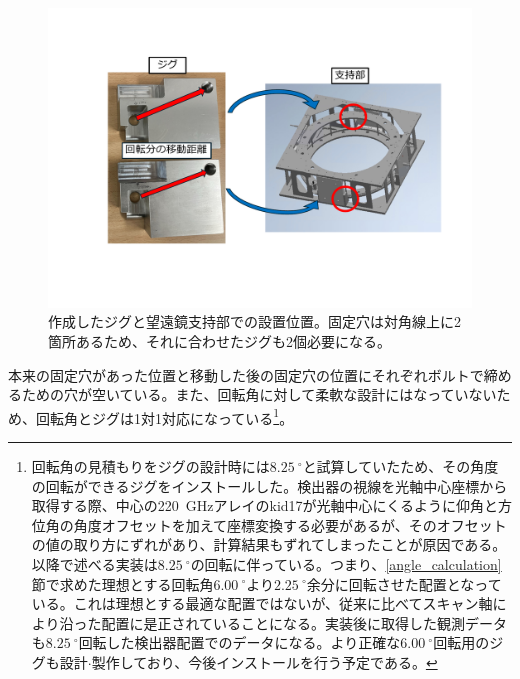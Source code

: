 \begin{figure}[htbp]
  \centering
  \includegraphics[width=0.85\columnwidth]{5_alignment/figs/jig_making.pdf}
  \caption{作成したジグと望遠鏡支持部での設置位置。固定穴は対角線上に2箇所あるため、それに合わせたジグも2個必要になる。}
  \label{jig_fixing}
\end{figure}
本来の固定穴があった位置と移動した後の固定穴の位置にそれぞれボルトで締めるための穴が空いている。また、回転角に対して柔軟な設計にはなっていないため、回転角とジグは1対1対応になっている\footnote{回転角の見積もりをジグの設計時には$\SI{8.25}{^{\circ}}$と試算していたため、その角度の回転ができるジグをインストールした。検出器の視線を光軸中心座標から取得する際、中心の\SI{220}{GHz}アレイのkid17が光軸中心にくるように仰角と方位角の角度オフセットを加えて座標変換する必要があるが、そのオフセットの値の取り方にずれがあり、計算結果もずれてしまったことが原因である。以降で述べる実装は$\SI{8.25}{^{\circ}}$の回転に伴っている。つまり、\ref{angle_calculation}節で求めた理想とする回転角$\SI{6.00}{^{\circ}}$より$\SI{2.25}{^{\circ}}$余分に回転させた配置となっている。これは理想とする最適な配置ではないが、従来に比べてスキャン軸により沿った配置に是正されていることになる。実装後に取得した観測データも$\SI{8.25}{^{\circ}}$回転した検出器配置でのデータになる。より正確な$\SI{6.00}{^{\circ}}$回転用のジグも設計$\cdot$製作しており、今後インストールを行う予定である。}。

